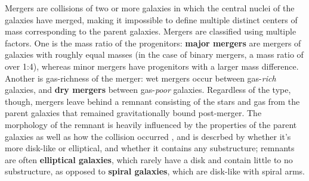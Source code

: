 \documentclass[twocolumn]{aastex631}
\begin{document}
Mergers are collisions of two or more galaxies in which the central nuclei of the galaxies have merged, making it impossible to define multiple distinct centers of mass corresponding to the parent galaxies.
Mergers are classified using multiple factors.
One is the mass ratio of the progenitors: \textbf{major mergers} are mergers of galaxies with roughly equal masses (in the case of binary mergers, a mass ratio of over 1:4), whereas minor mergers have progenitors with a larger mass difference.
Another is gas-richness of the merger: wet mergers occur between gas-\textit{rich} galaxies, and \textbf{dry mergers} between gas-\textit{poor} galaxies.
Regardless of the type, though, mergers leave behind a remnant consisting of the stars and gas from the parent galaxies that remained gravitationally bound post-merger. 
The morphology of the remnant is heavily influenced by the properties of the parent galaxies as well as how the collision occurred \citep{Barnes+1992}, and is descrbed by whether it's more disk-like or elliptical, and whether it contains any substructure; remnants are often \textbf{elliptical galaxies}, which rarely have a disk and contain little to no substructure, as opposed to \textbf{spiral galaxies}, which are disk-like with spiral arms.
\end{document}
